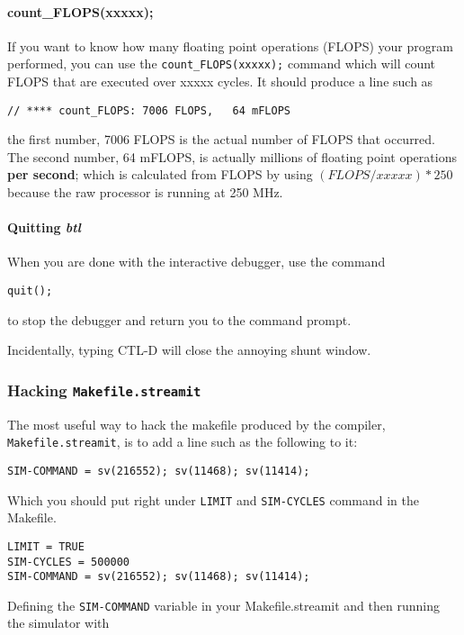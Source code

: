 \paragraph{count\_FLOPS(xxxxx);}
If you want to know how many floating point operations (FLOPS) your 
program performed, you can use the \texttt{count\_FLOPS(xxxxx);} command which will 
count FLOPS that are executed over xxxxx cycles. It should produce a line such as

\begin{verbatim}// **** count_FLOPS: 7006 FLOPS,   64 mFLOPS\end{verbatim}

the first number, 7006 FLOPS is the actual number of FLOPS that occurred. The second
number, 64 mFLOPS, is actually millions of floating point operations \textbf{per second};
which is calculated from FLOPS by using $(FLOPS/xxxxx) * 250$ because
the raw processor is running at 250 MHz.


\paragraph{Quitting \textit{btl}}
When you are done with the interactive debugger, use the command

\begin{verbatim}quit();\end{verbatim}

to stop the debugger and return you to the command prompt.

Incidentally, typing CTL-D will close the annoying shunt window.

\subsubsection{Hacking \texttt{Makefile.streamit}}
The most useful way to hack the makefile produced by the compiler,
\texttt{Makefile.streamit}, is to add a line such as the following to it:

\begin{verbatim}SIM-COMMAND = sv(216552); sv(11468); sv(11414);\end{verbatim}

Which you should put right under \texttt{LIMIT} and \texttt{SIM-CYCLES}
command in the Makefile.
\begin{verbatim}
LIMIT = TRUE
SIM-CYCLES = 500000
SIM-COMMAND = sv(216552); sv(11468); sv(11414); 
\end{verbatim}

Defining the \texttt{SIM-COMMAND} variable in your Makefile.streamit and 
then running the simulator with 

